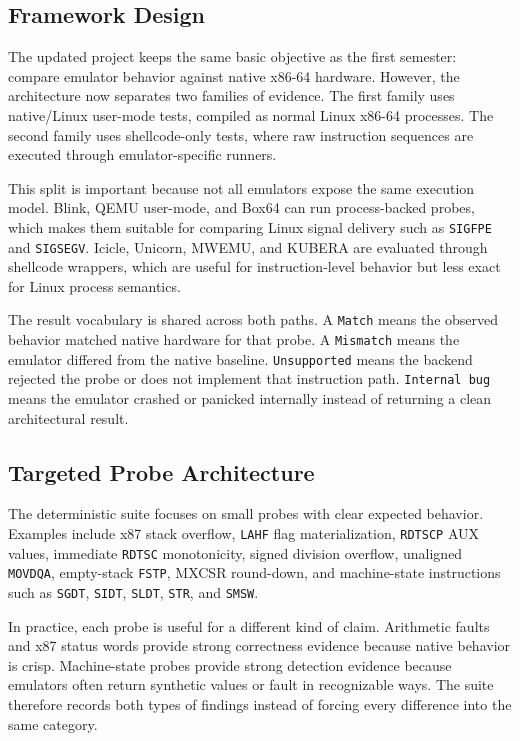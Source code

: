 
\subsection{Framework Design}

The updated project keeps the same basic objective as the first semester: compare emulator behavior against native x86-64 hardware. However, the architecture now separates two families of evidence. The first family uses native/Linux user-mode tests, compiled as normal Linux x86-64 processes. The second family uses shellcode-only tests, where raw instruction sequences are executed through emulator-specific runners.

This split is important because not all emulators expose the same execution model. Blink, QEMU user-mode, and Box64 can run process-backed probes, which makes them suitable for comparing Linux signal delivery such as \texttt{SIGFPE} and \texttt{SIGSEGV}. Icicle, Unicorn, MWEMU, and KUBERA are evaluated through shellcode wrappers, which are useful for instruction-level behavior but less exact for Linux process semantics.

The result vocabulary is shared across both paths. A \texttt{Match} means the observed behavior matched native hardware for that probe. A \texttt{Mismatch} means the emulator differed from the native baseline. \texttt{Unsupported} means the backend rejected the probe or does not implement that instruction path. \texttt{Internal bug} means the emulator crashed or panicked internally instead of returning a clean architectural result.

\subsection{Targeted Probe Architecture}

The deterministic suite focuses on small probes with clear expected behavior. Examples include x87 stack overflow, \texttt{LAHF} flag materialization, \texttt{RDTSCP} AUX values, immediate \texttt{RDTSC} monotonicity, signed division overflow, unaligned \texttt{MOVDQA}, empty-stack \texttt{FSTP}, MXCSR round-down, and machine-state instructions such as \texttt{SGDT}, \texttt{SIDT}, \texttt{SLDT}, \texttt{STR}, and \texttt{SMSW}.

In practice, each probe is useful for a different kind of claim. Arithmetic faults and x87 status words provide strong correctness evidence because native behavior is crisp. Machine-state probes provide strong detection evidence because emulators often return synthetic values or fault in recognizable ways. The suite therefore records both types of findings instead of forcing every difference into the same category.

